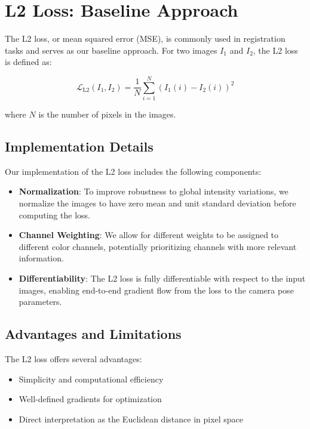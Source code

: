 \section{L2 Loss: Baseline Approach}

The L2 loss, or mean squared error (MSE), is commonly used in registration tasks and serves as our baseline approach. For two images $I_1$ and $I_2$, the L2 loss is defined as:

\begin{equation}
    \mathcal{L}_{\text{L2}}(I_1, I_2) = \frac{1}{N} \sum_{i=1}^{N} (I_1(i) - I_2(i))^2
\end{equation}

where $N$ is the number of pixels in the images.

\subsection{Implementation Details}

Our implementation of the L2 loss includes the following components:

\begin{itemize}
    \item \textbf{Normalization}: To improve robustness to global intensity variations, we normalize the images to have zero mean and unit standard deviation before computing the loss.
    
    \item \textbf{Channel Weighting}: We allow for different weights to be assigned to different color channels, potentially prioritizing channels with more relevant information.
    
    \item \textbf{Differentiability}: The L2 loss is fully differentiable with respect to the input images, enabling end-to-end gradient flow from the loss to the camera pose parameters.
\end{itemize}

\subsection{Advantages and Limitations}

The L2 loss offers several advantages:
\begin{itemize}
    \item Simplicity and computational efficiency
    \item Well-defined gradients for optimization
    \item Direct interpretation as the Euclidean distance in pixel space
\end{itemize}

